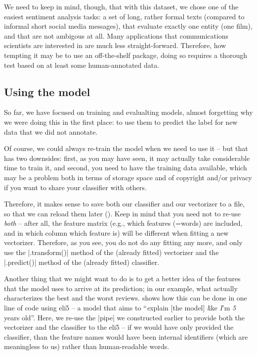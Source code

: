 
We need to keep in mind, though, that with this dataset, we chose one
of the easiest sentiment analysis tasks: a set of long, rather formal
texts (compared to informal short social media messages), that
evaluate exactly one entity (one film), and that are not ambigous at
all. Many applications that communications scientists are interested
in are much less straight-forward. Therefore, how tempting it may be
to use an off-the-shelf package, doing so requires a thorough test
based on at least some human-annotated data.



\subsection{Using the model}

So far, we have focused on training and evalualting models, almost
forgetting why we were doing this in the first place: to use them to
predict the label for new data that we did not annotate.

Of course, we could always re-train the model when we need to use it
-- but that has two downsides: first, as you may have seen, it may
actually take considerable time to train it, and second, you need to
have the training data available, which may be a problem both in terms
of storage space and of copyright and/or privacy if you want to share
your classifier with others.

Therefore, it makes sense to save both our classifier and our
vectorizer to a file, so that we can reload them later
(). Keep in mind that you need not to re-use \emph{both}
-- after all, the feature matrix (e.g., which features (=words) are
included, and in which column which feature is) will be different when
fitting a new vectorizer. Therefore, as you see, you do not do any fitting any more, and only use the |.transform()| method of the (already fitted) vectorizer and the |.predict()| method of the (already fitted) classifier.




Another thing that we might want to do is to get a better idea of the
features that the model uses to arrive at its prediction; in our
example, what actually characterizes the best and the worst
reviews.  shows how this can be done in one line of code
using eli5 -- a model that aims to ``\emph{e}xplain [the model]
\emph{l}ike \emph{I}'m \emph{5} years old''. Here, we re-use the
|pipe| we constructed earlier to provide both the vectorizer and the
classifier to the eli5 -- if we would have only provided the
classifier, than the feature names would have been internal
identifiers (which are meaningless to us) rather than human-readable
words.

